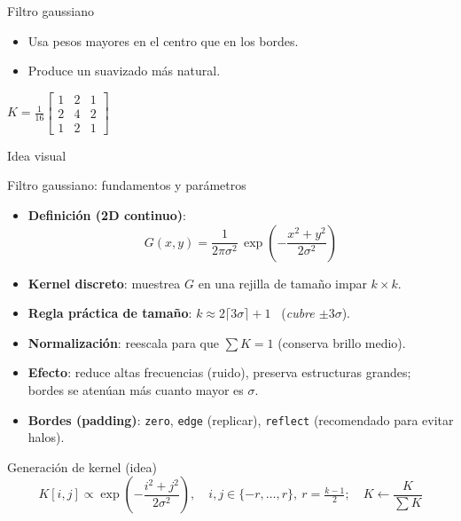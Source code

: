 \documentclass[10pt]{beamer}
\begin{document}
\begin{frame}{Filtro gaussiano}
\begin{itemize}
  \item Usa pesos mayores en el centro que en los bordes.
  \item Produce un suavizado m\'as natural.
\end{itemize}
\centering
$\displaystyle K = \frac{1}{16}\begin{bmatrix}1 & 2 & 1\\ 2 & 4 & 2\\ 1 & 2 & 1\end{bmatrix}$
\vspace{3mm}
\begin{block}{Idea visual}
\centering
{}
\end{block}
\end{frame}

\begin{frame}{Filtro gaussiano: fundamentos y par\'ametros}
\begin{itemize}
  \item \textbf{Definici\'on (2D continuo)}:
  \[
    G(x,y)=\frac{1}{2\pi\sigma^2}\,\exp\!\left(-\frac{x^2+y^2}{2\sigma^2}\right)
  \]
  \item \textbf{Kernel discreto}: muestrea $G$ en una rejilla de tama\~no impar $k\times k$.
  \item \textbf{Regla pr\'actica de tama\~no}: $k \approx 2\lceil 3\sigma\rceil + 1$ \ (\emph{cubre $\pm 3\sigma$}).
  \item \textbf{Normalizaci\'on}: reescala para que $\sum K=1$ (conserva brillo medio).
  \item \textbf{Efecto}: reduce altas frecuencias (ruido), preserva estructuras grandes; \\
        bordes se aten\'uan m\'as cuanto mayor es $\sigma$.
  \item \textbf{Bordes (padding)}: \texttt{zero}, \texttt{edge} (replicar), \texttt{reflect} (recomendado para evitar halos).
\end{itemize}
\vspace{2mm}
\begin{block}{Generaci\'on de kernel (idea)}
\[
K[i,j] \propto \exp\!\left(-\frac{i^2+j^2}{2\sigma^2}\right),\quad i,j\in\{-r,\dots,r\},\ r=\tfrac{k-1}{2};\quad K\leftarrow \frac{K}{\sum K}
\]
\end{block}
\end{frame}
\end{document}
